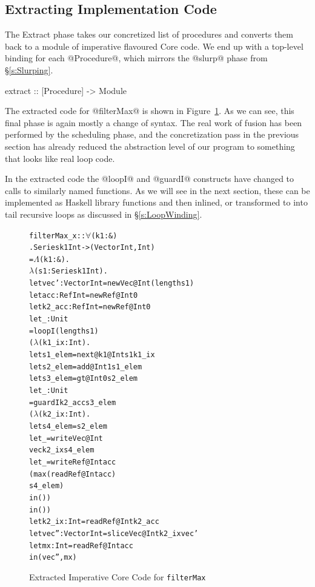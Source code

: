 \subsection{Extracting Implementation Code}
\label{s:Extract}
The Extract phase takes our concretized list of procedures and converts them back to a module of imperative flavoured Core code. We end up with a top-level binding for each @Procedure@, which mirrors the @slurp@ phase from \S\ref{s:Slurping}.
%
\begin{code}
  extract     :: [Procedure] -> Module
\end{code}
%
The extracted code for @filterMax@ is shown in Figure~\ref{f:filterMax-extracted}. As we can see, this final phase is again mostly a change of syntax. The real work of fusion has been performed by the scheduling phase, and the concretization pass in the previous section has already reduced the abstraction level of our program to something that looks like real loop code. 

In the extracted code the @loopI@ and @guardI@ constructs have changed to calls to similarly named functions. As we will see in the next section, these can be implemented as Haskell library functions and then inlined, or transformed to into tail recursive loops as discussed in \S\ref{s:LoopWinding}.


\begin{figure}
\begin{alltt}
filterMax_x :: \(\forall\)(k1 : &)
            .  Series k1 Int -> (Vector Int, Int)
 = \(\Lambda\)(k1 : &).
   \(\lambda\)(s1 : Series k1 Int).
   let vec'   : Vector Int = newVec @Int (length s1)
   let acc    : Ref Int    = newRef @Int 0    
   let k2_acc : Ref Int    = newRef @Int 0    
   let _ : Unit
       = loopI (length s1)
         (\(\lambda\)(k1_ix : Int).
          let s1_elem = next @k1 @Int s1 k1_ix 
          let s2_elem = add  @Int 1    s1_elem 
          let s3_elem = gt   @Int 0    s2_elem 
          let _  : Unit
              = guardI k2_acc s3_elem
                 (\(\lambda\)(k2_ix : Int).
                  let s4_elem = s2_elem
                  let _ = writeVec @Int
                            vec k2_ix s4_elem 
                  let _ = writeRef @Int acc
                            (max (readRef @Int acc) 
                                 s4_elem) 
                  in ()) 
          in ()) 
   let k2_ix : Int        = readRef  @Int k2_acc
   let vec'' : Vector Int = sliceVec @Int k2_ix vec'
   let mx    : Int        = readRef  @Int acc
   in  (vec'', mx)
\end{alltt}
\caption{Extracted Imperative Core Code for \texttt{filterMax}}
\label{f:filterMax-extracted}
\end{figure}

